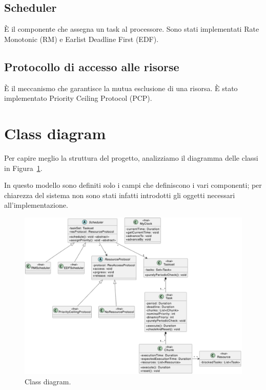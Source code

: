 \subsection{Scheduler}
È il componente che assegna un task al processore. Sono stati implementati Rate Monotonic (RM) e Earlist Deadline First (EDF).

\subsection{Protocollo di accesso alle risorse}
È il meccanismo che garantisce la mutua esclusione di una risorsa. È stato implementato Priority Ceiling Protocol (PCP).

\section{Class diagram}
Per capire meglio la struttura del progetto, analizziamo il diagramma delle classi in Figura~\ref{fig:classDiagram}.

In questo modello sono definiti solo i campi che definiscono i vari componenti; per chiarezza del sistema non sono stati infatti introdotti gli oggetti necessari all'implementazione.
\begin{figure}[htbp]
    \centering
    \includegraphics[width=1\textwidth]{immagini/class diagram.pdf}
    \caption{Class diagram.}
    \label{fig:classDiagram}
\end{figure}